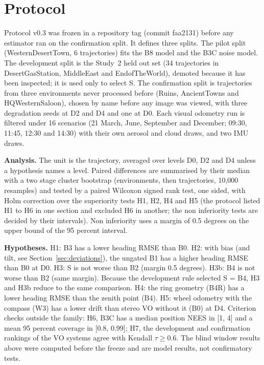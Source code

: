 \section{Protocol}
\label{sec:protocol}
Protocol v0.3 was frozen in a repository tag (commit faa2131) before any estimator ran on the confirmation split. It defines three splits. The pilot split (WesternDesertTown, 6 trajectories) fits the B8 model and the B3C noise model. The development split is the Study~2 held out set (34 trajectories in DesertGasStation, MiddleEast and EndofTheWorld), demoted because it has been inspected; it is used only to select S. The confirmation split is \sNconf{} trajectories from three environments never processed before (Ruins, AncientTowns and HQWesternSaloon), chosen by name before any image was viewed, with three degradation seeds at D2 and D4 and one at D0. Each visual odometry run is filtered under 16 scenarios (21 March, June, September and December; 09:30, 11:45, 12:30 and 14:30) with their own aerosol and cloud draws, and two IMU draws.

\textbf{Analysis.} The unit is the trajectory, averaged over levels D0, D2 and D4 unless a hypothesis names a level. Paired differences are summarised by their median with a two stage cluster bootstrap (environments, then trajectories, 10,000 resamples) and tested by a paired Wilcoxon signed rank test, one sided, with Holm correction over the superiority tests H1, H2, H4 and H5 (the protocol listed H1 to H6 in one section and excluded H6 in another; the non inferiority tests are decided by their intervals). Non inferiority uses a margin of 0.5 degrees on the upper bound of the 95 percent interval.

\textbf{Hypotheses.} H1: B3 has a lower heading RMSE than B0. H2: with bias (and tilt, see Section~\ref{sec:deviations}), the ungated B1 has a higher heading RMSE than B0 at D0. H3: S is not worse than B2 (margin 0.5 degrees). H3b: B4 is not worse than B2 (same margin). Because the development rule selected S = B4, H3 and H3b reduce to the same comparison. H4: the ring geometry (B4R) has a lower heading RMSE than the zenith point (B4). H5: wheel odometry with the compass (W3) has a lower drift than stereo VO without it (B0) at D4. Criterion checks outside the family: H6, B3C has a median position NEES in [1, 4] and a mean 95 percent coverage in [0.8, 0.99]; H7, the development and confirmation rankings of the VO systems agree with Kendall $\tau \ge 0.6$. The blind window results above were computed before the freeze and are model results, not confirmatory tests.

